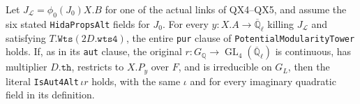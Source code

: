 \begin{proposition}
\label{claim:QX9}
Let $J_{\mathcal L}=\phi_0(J_0)X.B$ for one of the actual
links of QX4--QX5, and assume the six stated
\texttt{HidaPropsAlt} fields for $J_0$.
For every $y:X.A\to\overline{\mathbb Q}_\ell$ killing
$J_{\mathcal L}$ and satisfying
$T.\texttt{Wts}(2D.\texttt{wts4})$, the entire
\texttt{pur} clause of \texttt{PotentialModularityTower}
holds.  If, as in its \texttt{aut} clause, the original
$r:G_{\mathbb Q}\to\operatorname{GL}_4
(\overline{\mathbb Q}_\ell)$ is continuous, has
multiplier $D.\texttt{th}$, restricts to $X.P_y$ over
$F$, and is irreducible on $G_L$, then the literal
\texttt{IsAut4Alt}$\,\iota r$ holds, with the same
$\iota$ and for every imaginary quadratic field in
its definition.
\end{proposition}
